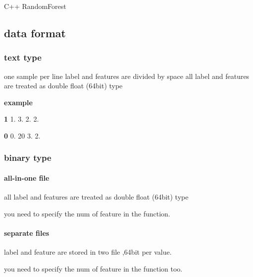C++ Random\+Forest

\subsection*{data format}

\subsubsection*{text type}

one sample per line label and features are divided by space all label and features are treated as double float (64bit) type

{\bfseries example}

{\bfseries 1} 1. 3. 2. 2.

{\bfseries 0} 0. 20 3. 2.

\subsubsection*{binary type}

\paragraph*{all-\/in-\/one file}

all label and features are treated as double float (64bit) type

you need to specify the num of feature in the function.

\paragraph*{separate files}

label and feature are stored in two file ,64bit per value.

you need to specify the num of feature in the function too. 